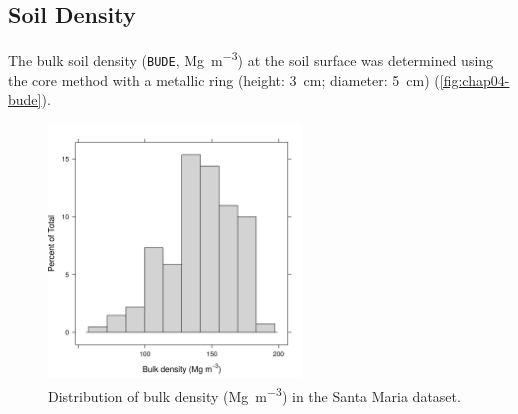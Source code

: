 %



\subsection{Soil Density}
\label{chap:chap04-bude}

The bulk soil density (\texttt{BUDE}, \si{\mega\gram\per\cubic\metre}) at the soil surface was determined 
using the core method with a metallic ring (height: \SI{3}{\centi\metre}; diameter: \SI{5}{\centi\metre}) 
\cite{ClaessenEtAl1997} (\autoref{fig:chap04-bude}).

\begin{figure}[!ht]
\centering
\includegraphics[width=0.60\textwidth]{fig/chap04-bude}
\caption[Distribution of bulk density in the Santa Maria dataset.]{Distribution of bulk density 
(\si{\mega\gram\per\cubic\metre}) in the Santa Maria dataset.}
\label{fig:chap04-bude}
\end{figure}

